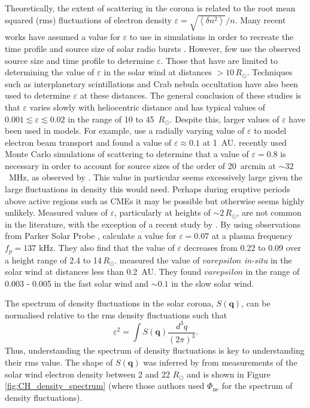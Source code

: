 Theoretically, the extent of scattering in the corona is related to the root mean squared (rms) fluctuations of electron density $\varepsilon = \sqrt{\left< \delta n^2 \right>}/n$. Many recent works have assumed a value for $\varepsilon$ to use in simulations in order to recreate the time profile and source size of solar radio bursts \citep[e.g.][]{Krupar2018, Kontar2019}. However, few use the observed source size and time profile to determine $\varepsilon$. Those that have are limited to determining the value of $\varepsilon$ in the solar wind at distances $> 10 \, R_\odot$. Techniques such as interplanetary scintillations \citep[e.g.][]{Bisoi2014} and Crab nebula occultation \citep{SasikumarRaja2016} have also been used to determine $\varepsilon$ at these distances. The general conclusion of these studies is that $\varepsilon$ varies slowly with heliocentric distance and has typical values of $0.001 \lesssim \varepsilon \lesssim 0.02$ in the range of 10 to 45 $\, R_\odot$. Despite this, larger values of $\varepsilon$ have been used in models. For example, \cite{Reid2010} use a radially varying value of $\varepsilon$ to model electron beam transport and found a value of $\varepsilon \approx 0.1$ at 1~AU. \cite{Kontar2019} recently used Monte Carlo simulations of scattering to determine that a value of $\varepsilon = 0.8$ is necessary in order to account for source sizes of the order of 20~arcmin at $\sim 32$~MHz, as observed by \cite{Kontar2017}. This value in particular seems excessively large given the large fluctuations in density this would need. Perhaps during eruptive periods above active regions such as CMEs it may be possible but otherwise seems highly unlikely. Measured values of $\varepsilon$, particularly at heights of ${\sim} 2 \, R_\odot$, are not common in the literature, with the exception of a recent study by \cite{Krupar2020}. By using observations from Parker Solar Probe \citep[PSP,][]{Fox2016}, \cite{Krupar2020} calculate a value for $\varepsilon = 0.07$ at a plasma frequency $f_p = 137$ kHz. They also find that the value of $\varepsilon$ decreases from 0.22 to 0.09 over a height range of 2.4 to 14$\, R_\odot$. \cite{Woo1995} measured the value of $varepsilon$ \textit{in-situ} in the solar wind at distances less than 0.2~AU. They found $varepsilon$ in the range of 0.003 - 0.005 in the fast solar wind and $\sim 0.1$ in the slow solar wind.

The spectrum of density fluctuations in the solar corona, $S(\mathbf{q})$, can be normalised relative to the rms density fluctuations such that \citep[e.g.][]{Kontar2019}
\begin{equation}
\varepsilon^2 = \int S(\mathbf{q})\frac{d^3q}{(2 \pi)^3}.
\end{equation}
Thus, understanding the spectrum of density fluctuations is key to understanding their rms value.
The shape of $S(\mathbf{q})$ was inferred by \cite{Coles1989} from measurements of the solar wind electron density between 2 and 22 $R_\odot$ and is shown in Figure \ref{fig:CH_density_spectrum} (where those authors used $\Phi_{\mbox{ne}}$ for the spectrum of density fluctuations).

